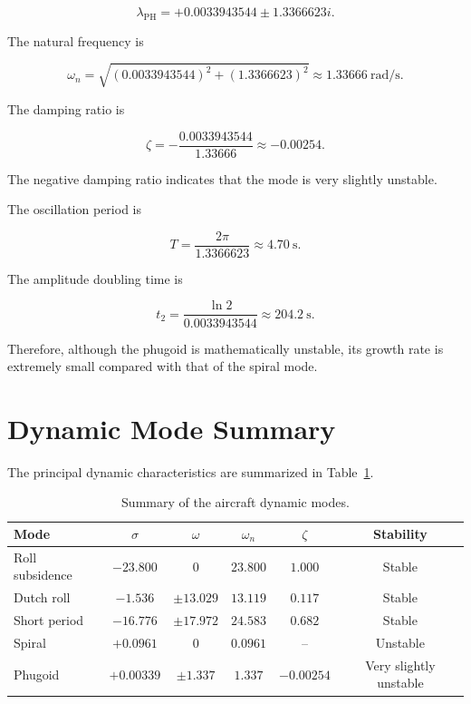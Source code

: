 \documentclass[11pt,a4paper]{article}
\begin{document}
\begin{equation}
\lambda_{\mathrm{PH}}
=
+0.0033943544
\pm1.3366623i.
\end{equation}

The natural frequency is

\begin{equation}
\omega_n
=
\sqrt{(0.0033943544)^2+(1.3366623)^2}
\approx1.33666~\mathrm{rad/s}.
\end{equation}

The damping ratio is

\begin{equation}
\zeta
=
-\frac{0.0033943544}{1.33666}
\approx-0.00254.
\end{equation}

The negative damping ratio indicates that the mode is very slightly
unstable.

The oscillation period is

\begin{equation}
T=
\frac{2\pi}{1.3366623}
\approx4.70~\mathrm{s}.
\end{equation}

The amplitude doubling time is

\begin{equation}
t_2
=
\frac{\ln2}{0.0033943544}
\approx204.2~\mathrm{s}.
\end{equation}

Therefore, although the phugoid is mathematically unstable, its growth
rate is extremely small compared with that of the spiral mode.

\section{Dynamic Mode Summary}

The principal dynamic characteristics are summarized in
Table~\ref{tab:mode_summary}.

\begin{table}[H]
\centering
\caption{Summary of the aircraft dynamic modes.}
\label{tab:mode_summary}
\begin{tabular}{lccccc}
\toprule
Mode & $\sigma$ & $\omega$ & $\omega_n$ & $\zeta$ & Stability \\
\midrule
Roll subsidence
& $-23.800$
& $0$
& $23.800$
& $1.000$
& Stable \\

Dutch roll
& $-1.536$
& $\pm13.029$
& $13.119$
& $0.117$
& Stable \\

Short period
& $-16.776$
& $\pm17.972$
& $24.583$
& $0.682$
& Stable \\

Spiral
& $+0.0961$
& $0$
& $0.0961$
& --
& Unstable \\

Phugoid
& $+0.00339$
& $\pm1.337$
& $1.337$
& $-0.00254$
& Very slightly unstable \\

\bottomrule
\end{tabular}
\end{table}
\end{document}
